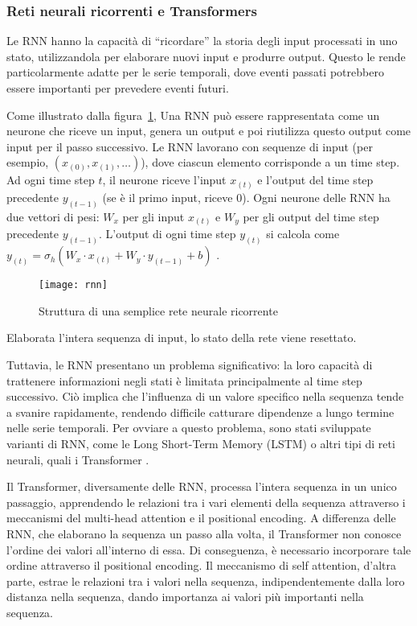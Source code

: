 \subsubsection{Reti neurali ricorrenti e Transformers}

Le RNN hanno la capacità di ``ricordare'' la storia degli input processati in
uno stato, utilizzandola per elaborare nuovi input e produrre output. Questo
le rende particolarmente adatte per le serie temporali, dove eventi passati
potrebbero essere importanti per prevedere eventi futuri.

Come illustrato dalla figura~\ref{fig:rnn}, Una RNN può essere rappresentata
come un neurone che riceve un input, genera un output e poi riutilizza questo
output come input per il passo successivo. Le RNN lavorano con sequenze di
input (per esempio, $(x_{(0)}, x_{(1)},\ldots)$), dove ciascun elemento
corrisponde a un time step. Ad ogni time step $t$, il neurone riceve l'input
$x_{(t)}$ e l'output del time step precedente $y_{(t-1)}$ (se è il primo
input, riceve 0). Ogni neurone delle RNN ha due vettori di pesi: $W_x$ per gli
input $x_{(t)}$ e $W_y$ per gli output del time step precedente $y_{(t-1)}$.
L'output di ogni time step $y_{(t)}$ si calcola come
$y_{(t)}=\sigma_h(W_x\cdot x_{(t)}+W_y\cdot y_{(t-1)}+b)$ \cite{geron2019}.

\begin{figure}[!ht]
    \centering
    \texttt{[image: rnn]}
    \caption{Struttura di una semplice rete neurale ricorrente \protect\cite{geron2019}}
    \label{fig:rnn}
\end{figure}

Elaborata l'intera sequenza di input, lo stato della rete viene resettato.

Tuttavia, le RNN presentano un problema significativo: la loro capacità di
trattenere informazioni negli stati è limitata principalmente al time step
successivo. Ciò implica che l'influenza di un valore specifico nella sequenza
tende a svanire rapidamente, rendendo difficile catturare dipendenze a lungo
termine nelle serie temporali. Per ovviare a questo problema, sono stati
sviluppate varianti di RNN, come le Long Short-Term Memory (LSTM)
\cite{hochreiter1997} o altri tipi di reti neurali, quali i Transformer
\cite{vaswani2023}.

Il Transformer, diversamente delle RNN, processa l'intera sequenza in un unico
passaggio, apprendendo le relazioni tra i vari elementi della sequenza
attraverso i meccanismi del multi-head attention e il positional encoding. A
differenza delle RNN, che elaborano la sequenza un passo alla volta, il
Transformer non conosce l'ordine dei valori all'interno di essa. Di
conseguenza, è necessario incorporare tale ordine attraverso il positional
encoding. Il meccanismo di self attention, d'altra parte, estrae le relazioni
tra i valori nella sequenza, indipendentemente dalla loro distanza nella
sequenza, dando importanza ai valori più importanti nella sequenza.

